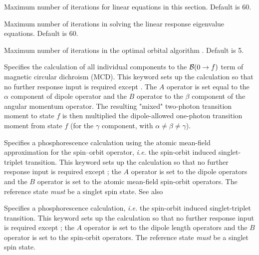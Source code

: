 \begin{description}
\item{}
Maximum number of iterations for linear equations in this section.
Default is 60.

\item{}
Maximum number of iterations in solving the linear
response eigenvalue
equations.
Default is 60.

\item{}
Maximum number of iterations in the optimal
orbital algorithm
\cite{tuhjahjajpjjcp84}.
Default is 5.

\item{}
Specifies the calculation of all individual components to the
${\cal{B}}(0\to f)$ term of magnetic circular dichroism
(MCD).
This keyword sets up the calculation so that no further response input is required except .
The $A$ operator is set equal to the $\alpha$ component of dipole
operator and
the $B$ operator to the $\beta$ component of the angular momentum
operator. The resulting "mixed" two-photon transition moment to state $f$
is then multiplied the dipole-allowed one-photon transition moment
from state $f$ (for the $\gamma$ component, with $\alpha \neq \beta \neq \gamma$).
\cite{Coriani:MCDRSP}

\item{}
Specifies a phosphorescence calculation using
the atomic mean-field approximation for the spin--orbit operator, {\it i.e.\/}
the spin-orbit
induced singlet-triplet transition. This keyword sets up the
calculation so that no further response input is required except ; the
$A$ operator is set to the dipole operators and
the $B$ operator
is set to the atomic mean-field spin-orbit
operators.
The reference state {\em must} be a singlet spin state. See also 

\item{}
Specifies a phosphorescence calculation, {\it i.e.\/}
the spin-orbit
induced singlet-triplet transition. This keyword sets up the
calculation so that no further response input is required except ; the
$A$ operator is set to the dipole length operators and
the $B$ operator is set to the spin-orbit
operators. \cite{ovhapjhjajthjojcp97,haovbmaqc27}
The reference state {\em must} be a singlet spin state.


\end{description}
